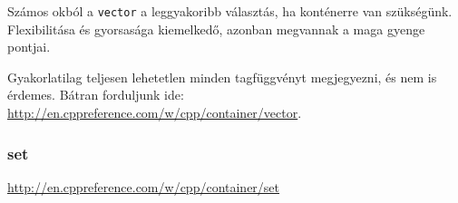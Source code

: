 \documentclass[a4paper,11.5pt]{article}
\begin{document}
	\begin{note}
		Számos okból a \texttt{vector} a leggyakoribb választás, ha konténerre van szükségünk. Flexibilitása és gyorsasága kiemelkedő, azonban megvannak a maga gyenge pontjai.
	\end{note}
	
	Gyakorlatilag teljesen lehetetlen minden tagfüggvényt megjegyezni, és nem is érdemes. Bátran forduljunk ide: \url{http://en.cppreference.com/w/cpp/container/vector}.
	\subsubsection{set}
	\url{http://en.cppreference.com/w/cpp/container/set}
	
%	
%	
	
\end{document}
